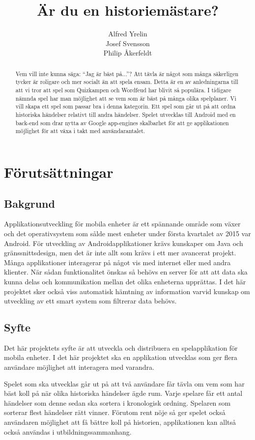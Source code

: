 \documentclass[swedish,12pt,a4paper]{article}
\author{Alfred Yrelin\\Josef Svensson\\Philip Åkerfeldt}
\title{Är du en historiemästare?}
\begin{document}
\maketitle
\newpage
\begin{abstract}
Vem vill inte kunna säga: ``Jag är bäst på...''? Att tävla är något som många säkerligen tycker är roligare och mer socialt än att spela ensam. Detta är en av anledningarna till att vi tror att spel som Quizkampen och Wordfeud har blivit så populära. I tidigare nämnda spel har man möjlighet att se vem som är bäst på många olika spelplaner. Vi vill skapa ett spel som passar bra i denna kategorin. Ett spel som går ut på att ordna historiska händelser relativt till andra händelser. Spelet utvecklas till Android med en back-end som drar nytta av Google app-engines skalbarhet för att ge applikationen möjlighet för att växa i takt med användarantalet. 

\end{abstract}
\pagebreak
\section{Förutsättningar}
\subsection{Bakgrund}
Applikationsutveckling för mobila enheter är ett spännande område som växer\cite{trendforce} och det operativsystem som sålde mest enheter under första kvartalet av 2015 var Android. För utveckling av Androidapplikationer krävs kunskaper om Java och gränssnittsdesign, men det är inte allt som krävs i ett mer avancerat projekt. Många applikationer interagerar på något vis med internet eller med andra klienter. När sådan funktionalitet önskas så behövs en server för att att data ska kunna delas och kommunikation mellan det olika enheterna upprättas. I det här projektet sker också viss automatisk hämtning av information varvid kunskap om utveckling av ett smart system som filtrerar data behövs.

\subsection{Syfte}
Det här projektets syfte är att utveckla och distribuera en spelapplikation för mobila enheter. I det här projektet ska en applikation utvecklas som ger flera användare möjlighet att interagera med varandra.

Spelet som ska utvecklas går ut på att två användare får tävla om vem som har bäst koll på när olika historiska händelser ägde rum. Varje spelare får ett antal händelser som denne sedan ska sortera i kronologisk ordning. Spelaren som sorterar flest händelser rätt vinner. Förutom rent nöje så ger spelet också användaren möjlighet att få bättre koll på historien, applikationen kan alltså också användas i utbildningssammanhang.
\end{document}
